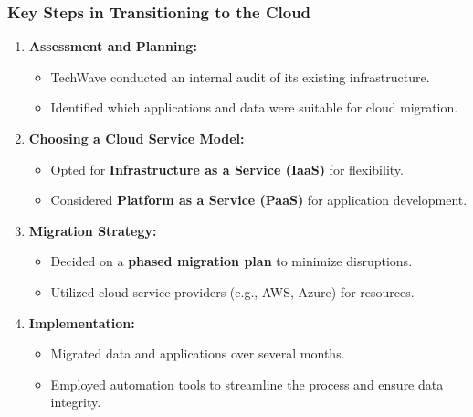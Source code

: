 \documentclass[aspectratio=169]{beamer}
\begin{document}
\begin{frame}[fragile]
    \frametitle{Key Steps in Transitioning to the Cloud}
    \begin{enumerate}
        \item \textbf{Assessment and Planning:}
        \begin{itemize}
            \item TechWave conducted an internal audit of its existing infrastructure.
            \item Identified which applications and data were suitable for cloud migration.
        \end{itemize}
        
        \item \textbf{Choosing a Cloud Service Model:}
        \begin{itemize}
            \item Opted for \textbf{Infrastructure as a Service (IaaS)} for flexibility.
            \item Considered \textbf{Platform as a Service (PaaS)} for application development.
        \end{itemize}
        
        \item \textbf{Migration Strategy:}
        \begin{itemize}
            \item Decided on a \textbf{phased migration plan} to minimize disruptions.
            \item Utilized cloud service providers (e.g., AWS, Azure) for resources.
        \end{itemize}

        \item \textbf{Implementation:}
        \begin{itemize}
            \item Migrated data and applications over several months.
            \item Employed automation tools to streamline the process and ensure data integrity.
        \end{itemize}
    \end{enumerate}
\end{frame}
\end{document}
